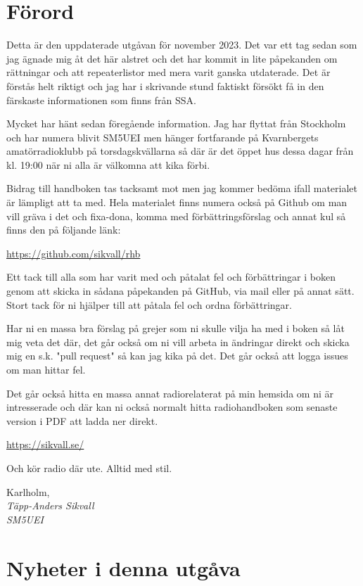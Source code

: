 \section*{Förord}

Detta är den uppdaterade utgåvan för november 2023. Det var ett tag sedan som
jag ägnade mig åt det här alstret och det har kommit in lite påpekanden om
rättningar och att repeaterlistor med mera varit ganska utdaterade. Det är
förstås helt riktigt och jag har i skrivande stund faktiskt försökt få in den
färskaste informationen som finns från SSA.

Mycket har hänt sedan föregående information. Jag har flyttat från Stockholm och
har numera blivit SM5UEI men hänger fortfarande på Kvarnbergets amatörradioklubb
på torsdagskvällarna så där är det öppet hus dessa dagar från kl. 19:00 när ni
alla är välkomna att kika förbi.

Bidrag till handboken tas tacksamt mot men jag kommer bedöma ifall materialet
är lämpligt att ta med.  Hela materialet finns numera också på Github om man
vill gräva i det och fixa-dona, komma med förbättrings\-förslag och annat kul
så finns den på följande länk:

\href{https://github.com/sikvall/rhb/}{https://github.com/sikvall/rhb}

Ett tack till alla som har varit med och påtalat fel och förbättringar i boken
genom att skicka in sådana påpekanden på GitHub, via mail eller på annat sätt.
Stort tack för ni hjälper till att påtala fel och ordna förbättringar.

Har ni en massa bra förslag på grejer som ni skulle vilja ha med i boken så låt
mig veta det där, det går också om ni vill arbeta in ändringar direkt och skicka
mig en s.k. "pull request" så kan jag kika på det. Det går också att logga
issues om man hittar fel.

Det går också hitta en massa annat radiorelaterat på min hemsida om ni är
intresserade och där kan ni också normalt hitta radiohandboken som senaste
version i PDF att ladda ner direkt.

\href{https://sikvall.se}{https://sikvall.se/}

Och kör radio där ute. Alltid med stil.

\vspace{4mm}

Karlholm, \DokumentDatum\\
\textit{Täpp-Anders Sikvall\\
	SM5UEI}

\clearpage

\section*{Nyheter i denna utgåva}


\clearpage


